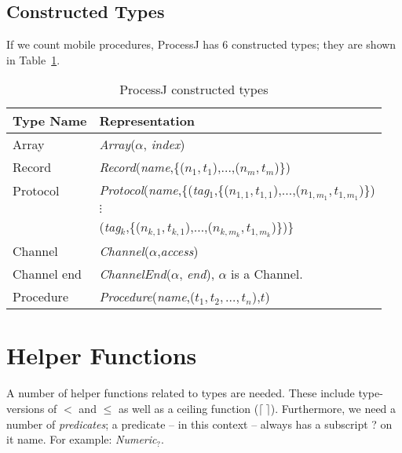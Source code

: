 \documentclass[]{article}
\begin{document}
\subsection{Constructed Types}
If we count mobile procedures, ProcessJ has 6 constructed types; they are shown in Table~\ref{tab:constructedTypes}.
\begin{table}[!h]
  \begin{center}
    \caption{ProcessJ constructed types}
    \label{tab:constructedTypes} 
    \begin{tabular}{|l|l|}\hline
      Type Name & Representation \\ \hline\hline
      Array    & {\it Array}($\alpha$, {\it index})\\
      Record   & {\it Record}({\it name},\{($n_1,t_1$),$\ldots$,($n_m,t_m$)\})\\
      Protocol & {\it Protocol}({\it name},\{({\it tag}$_1$,\{($n_{1,1},t_{1,1}$),$\ldots$,($n_{1,m_1},t_{1,m_1}$)\})\\
               & \hspace*{2.6cm}$\vdots$\\
      & \hspace*{2.475cm}({\it tag}$_k$,\{($n_{k,1},t_{k,1}$),$\ldots$,($n_{k,m_k},t_{1,m_k}$)\})\}\\
      Channel  & {\it Channel}($\alpha$,{\it access})\\
      Channel end & {\it ChannelEnd}($\alpha$, {\it end}), $\alpha$ is a Channel.\\ 
      Procedure & {\it Procedure}({\it name},($t_1,t_2,\ldots,t_n$),$t$)\\\hline
    \end{tabular}
  \end{center}
\end{table}

\newcommand{\teq}{=_{\cal T}}
\newcommand{\tev}{\sim_{\cal T}}
\newcommand{\tac}{:=_{\cal T}}
\newcommand{\tlt}{<_{\cal T}}
\newcommand{\tle}{\leq_{\cal T}}

\section{Helper Functions}

A number of helper functions related to types are needed. These include type-versions of $<$ and $\leq$ as well as a ceiling function ($\lceil\ \rceil$). Furthermore, we need a number of {\it predicates}; a predicate -- in this context -- always has a subscript ? on it name. For example: {\it Numeric}$_{?}$.
\end{document}
